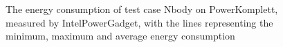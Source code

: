 \begin{figure}
                    \caption{The energy consumption of test case Nbody on PowerKomplett, measured by IntelPowerGadget, with the lines representing the minimum, maximum and average energy consumption} \label{fig:time_series_Nbody_PowerKomplett_IntelPowerGadget_exp2}
                    \end{figure}
                    